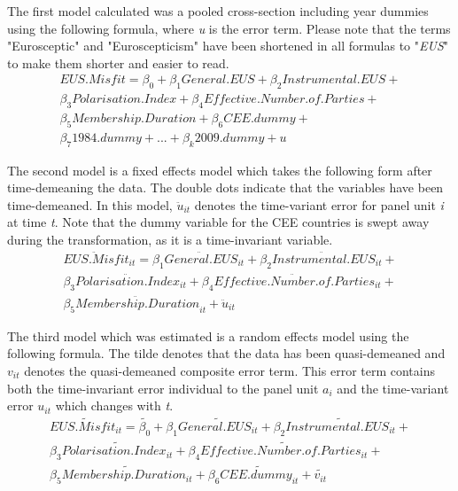 The first model calculated was a pooled cross-section including year dummies using the following formula, where \emph{u} is the error term. Please note that the terms "Eurosceptic" and "Euroscepticism" have been shortened in all formulas to "\emph{EUS}" to make them shorter and easier to read. 
\begin{equation}
\begin{split}
EUS.Misfit = \beta_0 + \beta_1 General.EUS + \beta_2 Instrumental.EUS + \\
\beta_3 Polarisation.Index + \beta_4 Effective.Number.of.Parties + \\
\beta_5 Membership.Duration + \beta_6 CEE.dummy + \\
\beta_7 1984.dummy + ... + \beta_k 2009.dummy + u
\end{split}
\end{equation}

The second model is a fixed effects model which takes the following form after time-demeaning the data. The double dots indicate that the variables have been time-demeaned. In this model, $\ddot{u}_{it}$ denotes the time-variant error for panel unit \emph{i} at time \emph{t}. Note that the dummy variable for the CEE countries is swept away during the transformation, as it is a time-invariant variable.
\begin{equation}
\begin{split}
\ddot{EUS.Misfit}_{it} = \beta_1 \ddot{General.EUS}_{it} + \beta_2 \ddot{Instrumental.EUS}_{it} + \\
\beta_3 \ddot{Polarisation.Index}_{it} + \beta_4 \ddot{Effective.Number.of.Parties}_{it} + \\
\beta_5 \ddot{Membership.Duration}_{it} + \ddot{u}_{it}
\end{split} 
\end{equation}

The third model which was estimated is a random effects model using the following formula. The tilde denotes that the data has been quasi-demeaned and $v_{it}$ denotes the quasi-demeaned composite error term. This error term contains both the time-invariant error individual to the panel unit $a_{i}$ and the time-variant error $u_{it}$ which changes with \emph{t}. 
\begin{equation}
\begin{split}
\tilde{EUS.Misfit_{it}} = \tilde{\beta_0} + \beta_1 \tilde{General.EUS_{it}} + \beta_2 \tilde{Instrumental.EUS_{it}} + \\
\beta_3 \tilde{Polarisation.Index_{it}} + \beta_4 \tilde{Effective.Number.of.Parties_{it}} + \\
\beta_5 \tilde{Membership.Duration_{it}} + \beta_6 \tilde{CEE.dummy_{it}} + \tilde{v_{it}}
\end{split}
\end{equation}


